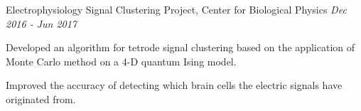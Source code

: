 Electrophysiology Signal Clustering Project, Center for Biological Physics \hfill \textsl{Dec 2016 - Jun 2017}

\begin{list2}
    \item {Developed an algorithm for tetrode signal clustering based on the application of Monte Carlo method on a 4-D quantum Ising model.}
    \item {Improved the accuracy of detecting which brain cells the electric signals have originated from.}
\end{list2}


